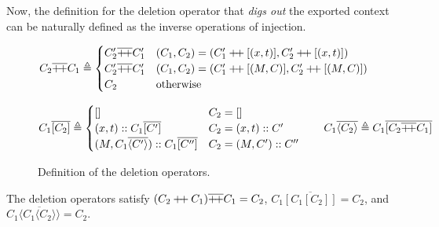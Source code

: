 \documentclass[acmsmall,review]{acmart}\settopmatter{printfolios=true,printccs=false,printacmref=false}
\theoremstyle{definition}
\newcommand*{\cons}{::}
\newcommand*{\doubleplus}{\ensuremath{\mathbin{+\mkern-3mu+}}}
\newcommand*{\mapinject}[2]{{#1}[{#2}]}
\newcommand*{\inject}[2]{{#1}\langle{#2}\rangle}
\newcommand*{\deletepre}[2]{{#2}\overline{\doubleplus}{#1}}
\newcommand*{\deletemap}[2]{{#1}\overline{[{#2}]}}
\newcommand*{\delete}[2]{{#1}\overline{\langle{#2}\rangle}}
\begin{document}
Now, the definition for the deletion operator that \emph{digs out} the exported context can be naturally defined as the inverse operations of injection.
\begin{figure}[h!]
  \footnotesize
  \[
    \deletepre{C_{1}}{C_{2}}\triangleq
    \begin{cases}
      \deletepre{C_{1}'}{C_{2}'} & (C_{1},C_{2})=(C_{1}'\doubleplus[(x,t)],C_{2}'\doubleplus[(x,t)]) \\
      \deletepre{C_{1}'}{C_{2}'} & (C_{1},C_{2})=(C_{1}'\doubleplus[(M,C)],C_{2}'\doubleplus[(M,C)]) \\
      C_{2}                      & \text{otherwise}
    \end{cases}
  \]

  \[
    \deletemap{C_{1}}{C_{2}}\triangleq
    \begin{cases}
      []                                                 & C_{2}=[]               \\
      (x,t)\cons\deletemap{C_{1}}{C'}                    & C_{2}=(x,t):: C'       \\
      (M, \delete{C_{1}}{C'})\cons\deletemap{C_{1}}{C''} & C_{2}=(M, C')\cons C''
    \end{cases}
    \qquad
    \delete{C_{1}}{C_{2}}\triangleq \deletemap{C_{1}}{\deletepre{C_{1}}{C_{2}}}
  \]
  \caption{Definition of the deletion operators.}
  \label{fig:concdelete}
\end{figure}

The deletion operators satisfy $\deletepre{C_1}{(C_2\doubleplus C_1)}=C_2$, $\deletemap{C_1}{\mapinject{C_1}{C_2}}=C_2$, and $\delete{C_1}{\inject{C_1}{C_2}}=C_2$.
\end{document}
